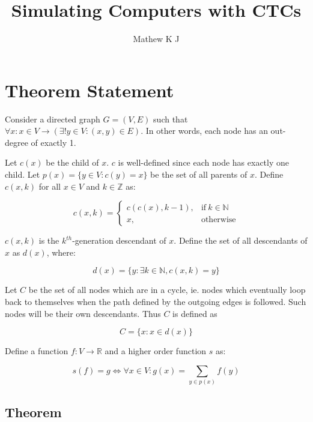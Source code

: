 \documentclass[11pt]{article}
\title{Simulating Computers with CTCs}
\author{Mathew K J}
\begin{document}
    \section{Theorem Statement}

    Consider a directed graph $G = (V,E)$ such that $\forall x: x \in V \rightarrow (\exists! y \in V: (x,y) \in E)$. In other words, each node has an out-degree of exactly 1.

    Let $c(x)$ be the child of $x$. $c$ is well-defined since each node has exactly one child. Let $p(x)=\{y\in V:c(y)=x\}$ be the set of all parents of $x$. Define $c(x, k)$ for all $x \in V$ and $k \in \mathbb{Z}$ as:

    \begin{equation}
        c(x,k)=
        \begin{cases}
            c(c(x),k-1), & \text{if}\ k \in \mathbb{N} \\
            x, & \text{otherwise}
        \end{cases}
    \end{equation}

    $c(x,k)$ is the $k^{th}$-generation descendant of $x$. Define the set of all descendants of $x$ as $d(x)$, where:

    \begin{equation}
        d(x) = \{y : \exists k\in \mathbb{N}, c(x,k) = y\}
    \end{equation}

    Let $C$ be the set of all nodes which are in a cycle, ie. nodes which eventually loop back to themselves when the path defined by the outgoing edges is followed. Such nodes will be their own descendants. Thus $C$ is defined as

    \begin{equation}
        C = \{x : x\in d(x)\}
    \end{equation}


    Define a function $f: V\rightarrow\mathbb{R}$ and a higher order function $s$ as:

    \begin{equation}
        s(f)=g \Leftrightarrow \forall x \in V: g(x) = \sum_{y \in p(x)} f(y)
    \end{equation}




    \subsection{Theorem}
\end{document}
